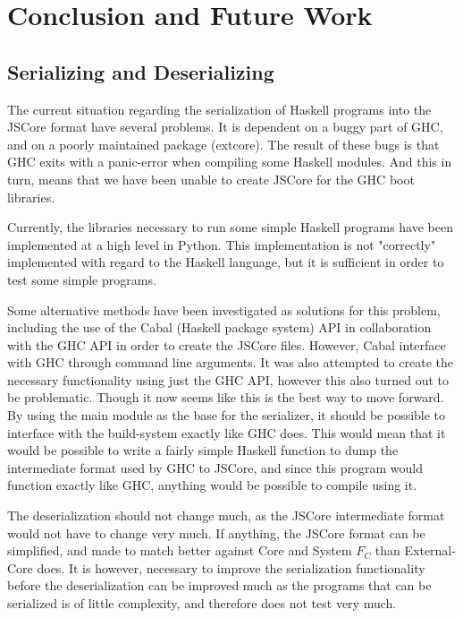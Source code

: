 
\section{Conclusion and Future Work}
\label{chap:conc}


\subsection{Serializing and Deserializing}

The current situation regarding the serialization of Haskell programs into 
the JSCore format have several problems. It is dependent on a buggy part of GHC, 
and on a poorly maintained package (extcore). The result of these bugs is that
GHC exits with a panic-error when compiling some Haskell modules. And this in
turn, means that we have been unable to create JSCore for the GHC boot libraries.

Currently, the libraries necessary to run some simple Haskell programs have been
implemented at a high level in Python. This implementation is not "correctly"
implemented with regard to the Haskell language, but it is sufficient in order
to test some simple programs.

Some alternative methods have been investigated as solutions for this problem,
including the use of the Cabal (Haskell package system) API in collaboration
with the GHC API in order to create the JSCore files. However, Cabal interface
with GHC through command line arguments. 
It was also attempted to create the necessary functionality using just the GHC
API, however this also turned out to be problematic. Though it now seems like
this is the best way to move forward. By using the main module as the base for
the serializer, it should be possible to interface with the build-system
exactly like GHC does. This would mean that it would be possible to write a
fairly simple Haskell function to dump the intermediate format used by GHC
to JSCore, and since this program would function exactly like GHC, anything 
would be possible to compile using it.

The deserialization should not change much, as the JSCore intermediate format
would not have to change very much. If anything, the JSCore format can be
simplified, and made to match better against Core and System $F_C$ than
External-Core does. It is however, necessary to improve the serialization
functionality before the deserialization can be improved much as the programs
that can be serialized is of little complexity, and therefore does not test
very much.




